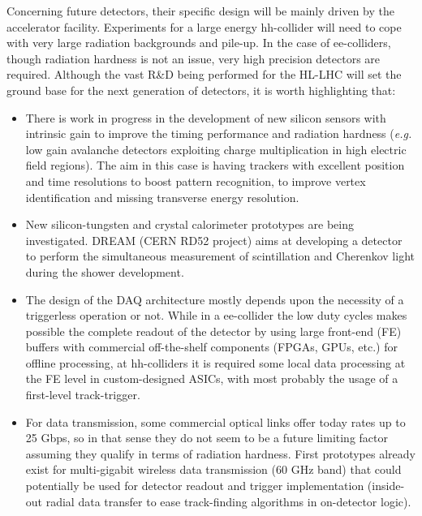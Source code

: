 \noindent Concerning future detectors, their specific design will be mainly driven by the accelerator facility. Experiments for a large energy hh-collider will need to cope with very large radiation backgrounds and pile-up. In the case of ee-colliders, though radiation hardness is not an issue, very high precision detectors are required. Although the vast R\&D being performed for the HL-LHC will set the ground base for the next generation of detectors, it is worth highlighting that:

\begin{itemize}

\item There is work in progress in the development of new silicon sensors with intrinsic gain to improve the timing performance and radiation hardness ({\em e.g.} low gain avalanche detectors exploiting charge multiplication in high electric field regions). The aim in this case is having trackers with excellent position and time resolutions to boost pattern recognition, to improve vertex identification and missing transverse energy resolution. 

\item New silicon-tungsten and crystal calorimeter prototypes are being investigated. DREAM (CERN RD52 project) aims at developing a detector to perform the simultaneous measurement of scintillation and Cherenkov light during the shower development.

\item The design of the DAQ architecture mostly depends upon the necessity of a triggerless operation or not. While in a ee-collider the low duty cycles makes possible the complete readout of the detector by using large front-end (FE) buffers with commercial off-the-shelf components (FPGAs, GPUs, etc.) for offline processing, at hh-colliders it is required some local data processing at the FE level in custom-designed ASICs, with most probably the usage of a first-level track-trigger. 

\item For data transmission, some commercial optical links offer today rates up to 25 Gbps, so in that sense they do not seem to be a future limiting factor assuming they qualify in terms of radiation hardness. First prototypes already exist for multi-gigabit wireless data transmission (60 GHz band) that could potentially be used for detector readout and trigger implementation (inside-out radial data transfer to ease track-finding algorithms in on-detector logic).

\end{itemize}

